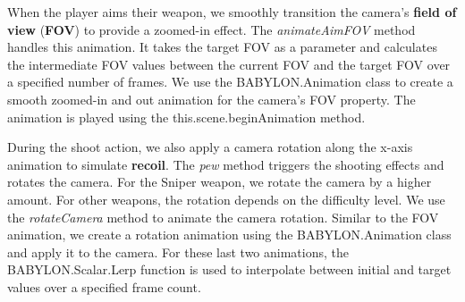 \documentclass[12pt,a4paper,oneside]{article}
\theoremstyle{definition}
\begin{document}
When the player aims their weapon, we smoothly transition the camera's \textbf{field of view} (\textbf{FOV}) to provide a zoomed-in effect. The \textit{animateAimFOV} method handles this animation. It takes the target FOV as a parameter and calculates the intermediate FOV values between the current FOV and the target FOV over a specified number of frames. We use the BABYLON.Animation class to create a smooth zoomed-in and out animation for the camera's FOV property. The animation is played using the this.scene.beginAnimation method.

During the shoot action, we also apply a camera rotation along the x-axis animation to simulate \textbf{recoil}. The \textit{pew} method triggers the shooting effects and rotates the camera. For the Sniper weapon, we rotate the camera by a higher amount. For other weapons, the rotation depends on the difficulty level. We use the \textit{rotateCamera} method to animate the camera rotation. Similar to the FOV animation, we create a rotation animation using the BABYLON.Animation class and apply it to the camera. For these last two animations, the BABYLON.Scalar.Lerp function is used to interpolate between initial and target values over a specified frame count. 
\end{document}
